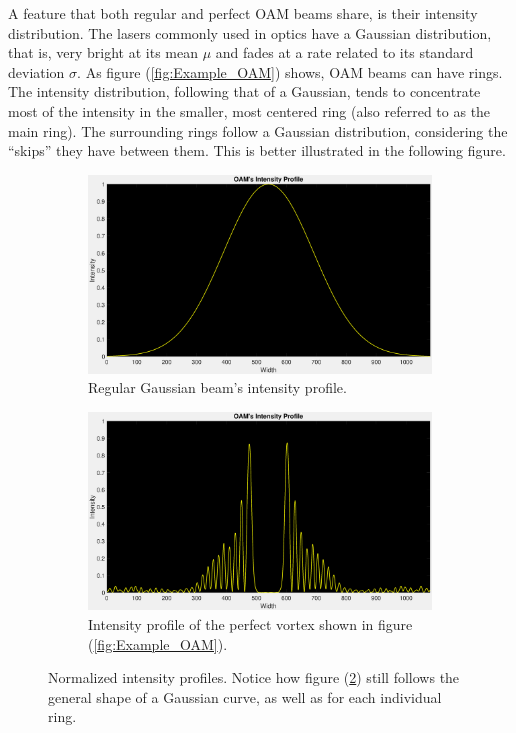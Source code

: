 A feature that both regular and perfect OAM beams share, is their intensity distribution. The lasers commonly used in optics have a Gaussian distribution, that is, very bright at its mean $\mu$ and fades at a rate related to its standard deviation $\sigma$. As figure (\ref{fig:Example_OAM}) shows, OAM beams can have rings. The intensity distribution, following that of a Gaussian, tends to concentrate most of the intensity in the smaller, most centered ring (also referred to as the main ring). The surrounding rings follow a Gaussian distribution, considering the ``skips'' they have between them. This is better illustrated in the following figure.

\begin{figure}[htbp]
    \centering
    \begin{subfigure}[b]{0.45\textwidth}
        \centering
        \includegraphics[width=\textwidth]{images/c02/OAM/Gauss_Profile.eps}
        \caption{Regular Gaussian beam's intensity profile.}
        \label{fig:example_Gaussian_profile}
    \end{subfigure}
    \hfill
    \begin{subfigure}[b]{0.45\textwidth}
        \centering
        \includegraphics[width=\textwidth]{images/c02/OAM/Gaussian_Profile.eps}
        \caption{Intensity profile of the perfect vortex shown in figure (\ref{fig:Example_OAM}).}
        \label{fig:example_perfect_OAM_profile}
    \end{subfigure}
    \caption{Normalized intensity profiles. Notice how figure (\ref{fig:example_perfect_OAM_profile}) still follows the general shape of a Gaussian curve, as well as for each individual ring.}
    \label{fig:Example_Intesity_Profiles}
\end{figure}

